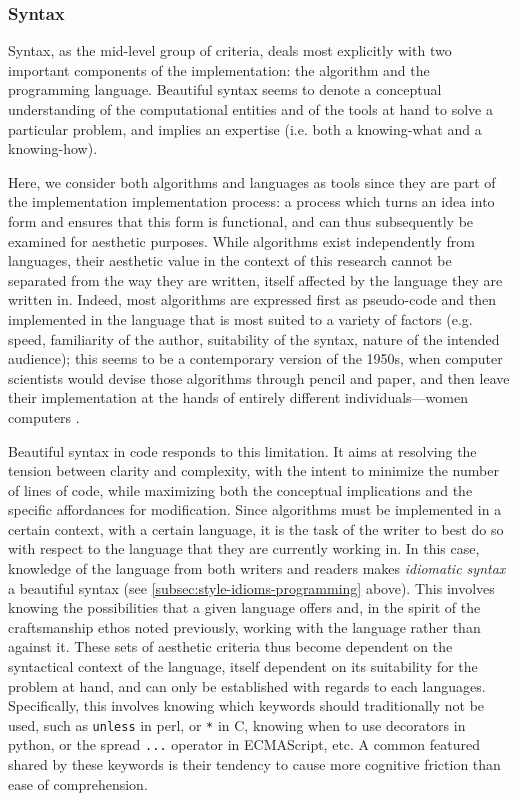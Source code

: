 \subsubsection{Syntax}
\label{subsubsec:framework-syntax}

Syntax, as the mid-level group of criteria, deals most explicitly with two important components of the implementation: the algorithm and the programming language. Beautiful syntax seems to denote a conceptual understanding of the computational entities and of the tools at hand to solve a particular problem, and implies an expertise (i.e. both a knowing-what and a knowing-how).

Here, we consider both algorithms and languages as tools since they are part of the implementation implementation process: a process which turns an idea into form and ensures that this form is functional, and can thus subsequently be examined for aesthetic purposes. While algorithms exist independently from languages, their aesthetic value in the context of this research cannot be separated from the way they are written, itself affected by the language they are written in. Indeed, most algorithms are expressed first as pseudo-code and then implemented in the language that is most suited to a variety of factors (e.g. speed, familiarity of the author, suitability of the syntax, nature of the intended audience); this seems to be a contemporary version of the 1950s, when computer scientists would devise those algorithms through pencil and paper, and then leave their implementation at the hands of entirely different individuals—women computers \citep{chun_software_2005}.

Beautiful syntax in code responds to this limitation. It aims at resolving the tension between clarity and complexity, with the intent to minimize the number of lines of code, while maximizing both the conceptual implications and the specific affordances for modification. Since algorithms must be implemented in a certain context, with a certain language, it is the task of the writer to best do so with respect to the language that they are currently working in. In this case, knowledge of the language from both writers and readers makes \emph{idiomatic syntax} a beautiful syntax (see \ref{subsec:style-idioms-programming} above). This involves knowing the possibilities that a given language offers and, in the spirit of the craftsmanship ethos noted previously, working with the language rather than against it. These sets of aesthetic criteria thus become dependent on the syntactical context of the language, itself dependent on its suitability for the problem at hand, and can only be established with regards to each languages. Specifically, this involves knowing which keywords should traditionally not be used, such as \lstinline{unless} in perl, or \lstinline{*} in C, knowing when to use decorators in python, or the spread \lstinline{...} operator in ECMAScript, etc. A common featured shared by these keywords is their tendency to cause more cognitive friction than ease of comprehension.

